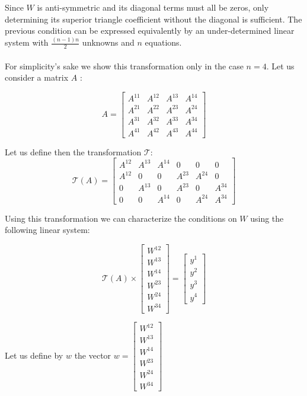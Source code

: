 \documentclass{article}
\begin{document}
\begin{appendices}
Since $W$ is anti-symmetric and its diagonal terms must all be zeros, only determining its superior triangle coefficient without the diagonal is sufficient. The previous condition can be expressed equivalently by an under-determined linear system with $\frac{(n-1)n}{2}$ unknowns and $n$ equations. 

\paragraph{}
For simplicity's sake we show this transformation only in the case $n=4$. Let us consider a matrix $A$ :

$$
A
=
\begin{bmatrix}
A^{11} & A^{12} & A^{13} & A^{14}\\
A^{21} & A^{22} & A^{23} & A^{24}\\
A^{31} & A^{32} & A^{33} & A^{34}\\
A^{41} & A^{42} & A^{43} & A^{44}
\end{bmatrix}
$$ 


Let us define then the transformation $\mathcal{T}$:
$$
\mathcal{T}(A)
=
\begin{bmatrix}
A^{12} & A^{13} & A^{14} & 0 & 0 & 0 \\
A^{12} & 0 & 0 & A^{23} & A^{24} & 0 \\
0 & A^{13} & 0 & A^{23} & 0 & A^{34} \\
0 & 0 & A^{14} & 0 & A^{24} & A^{34}
\end{bmatrix}
$$

Using this transformation we can characterize the conditions on $W$ using the following linear system:

$$
\mathcal{T}(A) 
\times
\begin{bmatrix}
W^{12} \\
W^{13}\\
W^{14} \\
W^{23}\\
W^{24} \\
W^{34}
\end{bmatrix}
=
\begin{bmatrix}
y^1 \\
y^2\\
y^3 \\
y^4
\end{bmatrix}
$$

Let us define by $w$ the vector $w = \begin{bmatrix}
W^{12} \\
W^{13}\\
W^{14} \\
W^{23}\\
W^{24} \\
W^{34}
\end{bmatrix}$


\end{appendices}
\end{document}
